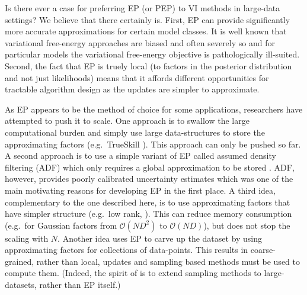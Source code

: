 Is there ever a case for preferring EP (or PEP) to VI methods in large-data settings?  We believe that there certainly is. First, EP can provide significantly more accurate approximations for certain model classes. It is well known that variational free-energy approaches are biased and often severely so \cite{turner+sahani:2011} and for particular models the variational free-energy objective is pathologically ill-suited\cite{cunningham:gaussianEP,turner}. Second, the fact that EP is truely local (to factors in the posterior distribution and not just likelihoods) means that it affords different opportunities for tractable algorithm design as the updates are simpler to approximate.

As EP appears to be the method of choice for some applications, researchers have attempted to push it to scale. One approach is to swallow the large computational burden and simply use large data-structures to store the approximating factors (e.g.~TrueSkill \cite{herbrich:trueskill}). This approach can only be pushed so far. A second approach is to use a simple variant of EP called assumed density filtering (ADF) which only requires a global approximation to be stored \cite{maybeck:adf}. ADF, however, provides poorly calibrated uncertainty estimates \cite{minka:ep} which was one of the main motivating reasons for developing EP in the first place. 
A third idea, complementary to the one described here, is to use approximating factors that have simpler structure (e.g.~low rank, \cite{qi+minka:sparseGP}). This can reduce memory consumption (e.g.~for Gaussian factors from $\mathcal{O}(ND^2)$ to $\mathcal{O}(ND)$), but does not stop the scaling with $N$. Another idea uses EP to carve up the dataset \cite{gelman:dep,xu:sms} by using approximating factors for collections of data-points. This results in coarse-grained, rather than local, updates and sampling based methods must be used to compute them. (Indeed, the spirit of \cite{gelman:dep,xu:sms} is to extend sampling methods to large-datasets, rather than EP itself.) 

